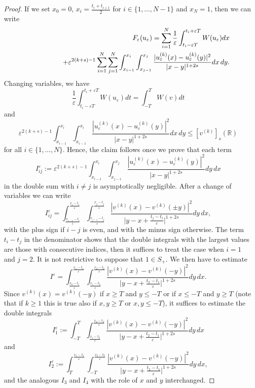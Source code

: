 \documentclass[10pt,a4paper]{amsart}
\newcommand{\e}{\varepsilon}
\begin{document}
\begin{proof}
If we set $x_0=0$, $x_i=\frac{t_i+t_{i+1}}2$ for $i\in\{1,\ldots, N-1\}$ and $x_N=1$, 
then we can write
\begin{eqnarray*}
&&F_\e(u_\e)=\sum_{i=1}^N\frac1\e\int_{t_i-\e T}^{t_i+\e T}W(u_\e)dx 
\\&&\hskip1.5cm+\e^{2(k+s)-1}
\sum_{i=1}^N\sum_{j=1}^N\int_{x_{i-1}}^{x_i}\int_{x_{j-1}}^{x_j}\frac{|u^{(k)}_\e(x)-
u^{(k)}_\e(y)|^2}{|x-y|^{1+2s}}dx\,dy.
\end{eqnarray*}
Changing variables, we have 
$$
\frac1\e\int_{t_i-\e T}^{t_i+\e T}W(u_\e)dt= \int_{-T}^T W(v)dt
$$
and 
$$
\e^{2(k+s)-1}\int_{x_{i-1}}^{x_i}\int_{x_{i-1}}^{x_i}\frac{|u^{(k)}_\e(x)-
u^{(k)}_\e(y)|^2}{|x-y|^{1+2s}}dx\,dy\le [v^{(k)}]_{s}(\mathbb R)
$$
 for all $i\in\{1,\ldots, N\}$.
Hence, the claim follows once we prove that each term
\begin{equation}\label{Iij} I^\e_{ij}:=
\e^{2(k+s)-1}\int_{x_{i-1}}^{x_i}\int_{x_{j-1}}^{x_j}\frac{|u^{(k)}_\e(x)-
u^{(k)}_\e(y)|^2}{|x-y|^{1+2s}}dy\,dx
\end{equation}
in the double sum with $i\neq j$ is asymptotically negligible. After a change of variables we can write
$$
I^\e_{ij}=\int_{\frac{x_{i-1}-t_i}\e}^{\frac{x_i-t_i}\e}\int_{\frac{x_{j-1}-t_j}\e}^{\frac{x_j-t_j}\e} \frac{|v^{(k)}(x)-
v^{(k)}(\pm y)|^2}{\big|y-x+\frac{t_j-t_i}\e \big|^{1+2s}}dy\,dx,
$$
with the plus sign if $i-j$ is even, and with the minus sign otherwise. The term $t_i-t_j$ in the denominator shows that the double integrals with the largest values are those with consecutive indices, then it suffices to treat the case when $i=1$ and $j=2$.  It is not restrictive to suppose that $1\in S_+$. We then have to estimate 
$$
I^\e=\int_{\frac{x_0-t_1}\e}^{\frac{x_1-t_1}\e}\int_{\frac{x_1-t_2}\e}^{\frac{x_2-t_2}\e} \frac{|v^{(k)}(x)-
v^{(k)}(-y)|^2}{\big|y-x+\frac{t_2-t_1}\e \big|^{1+2s}}dy\,dx.
$$
Since $v^{(k)}(x)=v^{(k)}(-y)$ if $x\ge T$ and $y\le -T$ or  if $x\le -T$ and $y\ge T$ (note that if $k\ge 1$ this is true also if $x,y\ge T$ or $x,y\le -T$), it suffices to estimate the double integrals
$$
I^\e_1:=\int_{-T}^{T}\int_{\frac{x_1-t_2}\e}^{\frac{x_2-t_2}\e} \frac{|v^{(k)}(x)-
v^{(k)}(-y)|^2}{\big|y-x+\frac{t_2-t_1}\e \big|^{1+2s}}dy\,dx
$$
and 
$$
I^\e_2:=\int_{T}^{\frac{x_1-t_1}\e}\int_{-T}^{\frac{x_2-t_2}\e} \frac{|v^{(k)}(x)-
v^{(k)}(-y)|^2}{\big|y-x+\frac{t_2-t_1}\e \big|^{1+2s}}dy\,dx,
$$
and the analogous $I_3$ and $I_4$ with the role of $x$ and $y$ interchanged.


\end{proof}
\end{document}
